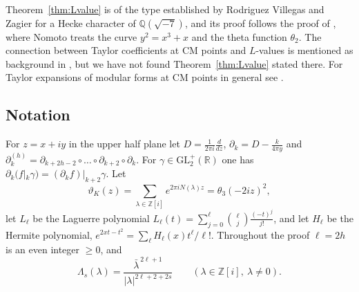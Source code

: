 \documentclass[11pt]{amsart}
\theoremstyle{definition}
\theoremstyle{remark}
\newcommand{\Z}{\mathbb{Z}}
\newcommand{\Q}{\mathbb{Q}}
\begin{document}
Theorem~\ref{thm:Lvalue} is of the type established by Rodriguez Villegas and Zagier \cite{VZ}
for a Hecke character of $\Q(\sqrt{-7})$, and its proof follows the proof of
\cite[Theorem~2.10]{Nomoto}, where Nomoto treats the curve $y^2=x^3+x$ and the theta function
$\theta_2$. The connection between Taylor coefficients at CM points and $L$-values is mentioned
as background in \cite{Romik,GMR,KM}, but we have not found Theorem~\ref{thm:Lvalue} stated there.
For Taylor expansions of modular forms at CM points in general see
\cite[Sections~5.1 and~6.3]{Zagier}.

\subsection*{Notation} For $z=x+iy$ in the upper half plane let $D=\frac1{2\pi i}\frac{d}{dz}$,
$\partial_k=D-\frac{k}{4\pi y}$ and
$\partial_k^{(h)}=\partial_{k+2h-2}\circ\dots\circ\partial_{k+2}\circ\partial_k$. For
$\gamma\in\mathrm{GL}_2^+(\mathbb R)$ one has
$\partial_k(f|_k\gamma)=(\partial_kf)|_{k+2}\gamma$. Let
\[
\vartheta_K(z)=\sum_{\lambda\in\Z[i]}e^{2\pi iN(\lambda)z}=\theta_3(-2iz)^2 ,
\]
let $L_\ell$ be the Laguerre polynomial $L_\ell(t)=\sum_{j=0}^\ell\binom{\ell}{j}\frac{(-t)^j}{j!}$, and let
$H_\ell$ be the Hermite polynomial, $e^{2xt-t^2}=\sum_{\ell}H_\ell(x)t^\ell/\ell!$. Throughout the proof $\ell=2h$ is
an even integer $\ge0$, and
\[
\Lambda_s(\lambda)=\frac{\bar\lambda^{\,2\ell+1}}{|\lambda|^{2\ell+2+2s}}\qquad(\lambda\in\Z[i],\ \lambda\ne0).
\]
\end{document}
